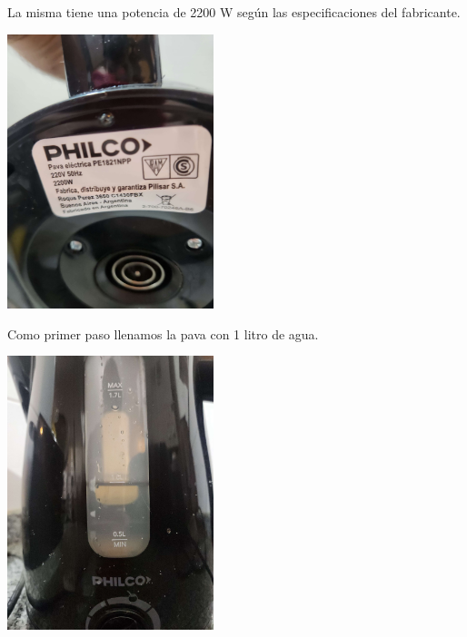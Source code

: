 \documentclass[]{article}
\begin{document}
\begin{flushleft}
	La misma tiene una potencia de 2200 W según las especificaciones del fabricante.
\end{flushleft}
\begin{center}
	\includegraphics[width=6cm]{pava2.jpg}
\end{center}

\begin{center}
	Como primer paso llenamos la pava con 1 litro de agua.
\end{center}
\begin{center}
	\includegraphics[width=6cm]{pava3.jpg}
\end{center}

\newpage
\end{document}
